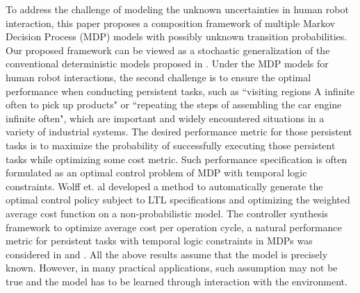 \documentclass[journal]{IEEEtran}
\begin{document}
To address the challenge of modeling the unknown uncertainties in human robot interaction, this paper proposes a composition framework of multiple Markov Decision Process (MDP) models with possibly unknown transition probabilities.  Our proposed framework can be viewed as a stochastic generalization of the conventional deterministic models proposed in \cite{lee1992trust,  sadrfaridpour2016modeling}. 
Under the MDP models for human robot interactions,
the second challenge is to ensure the optimal performance
when conducting persistent
tasks, such as ``visiting regions A infinite often to pick up products" or ``repeating the steps of assembling the car engine infinite often", which are important and widely encountered situations in a variety of industrial systems. The desired performance metric for those
persistent tasks is to maximize the probability of successfully executing those persistent tasks while optimizing some cost metric.  Such performance specification is often
formulated as an optimal control problem of MDP with
temporal logic constraints. Wolff et. al \cite{wolff2012optimal} developed a method to automatically generate the optimal control policy subject to LTL specifications and optimizing the weighted average cost function on a non-probabilistic model. The controller synthesis framework to optimize average cost per operation cycle, a natural performance metric for persistent tasks with temporal logic constraints in MDPs was considered in \cite{ding2014optimal} and \cite{svorenova2013optimal}. All the above results assume that the model is precisely known. However, in many practical applications, such assumption may not be true and the model has to be learned through interaction with the environment. 
\end{document}
